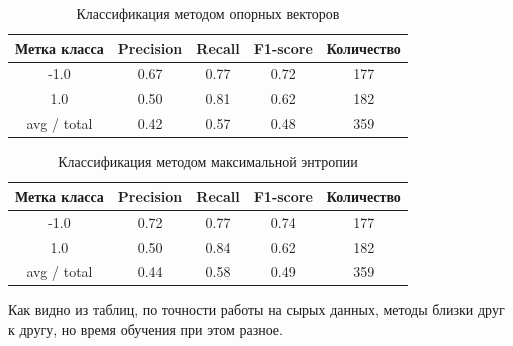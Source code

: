 \begin{table}[h]
  \begin{minipage}{\textwidth}
    \centering
    \begin{tabular}{|c|c|c|c|c|}
      \hline
      \textbf{Метка класса} & \textbf{Precision} & \textbf{Recall} & \textbf{F1-score} &
      \textbf{Количество} \\ \hline
      -1.0&0.67&0.77&0.72&177\\ \hline
      1.0&0.50&0.81&0.62&182\\ \hline \hline
      avg / total&0.42&0.57&0.48&359\\
      \hline
    \end{tabular}
    \caption{Классификация методом опорных векторов}\label{tab:svm}
  \end{minipage}
\end{table}


\begin{table}[h]
  \begin{minipage}{\textwidth}
    \centering
    \begin{tabular}{|c|c|c|c|c|}
      \hline
      \textbf{Метка класса} & \textbf{Precision} & \textbf{Recall} & \textbf{F1-score} & \textbf{Количество} \\ \hline
      -1.0&0.72&0.77&0.74&177\\ \hline
      1.0&0.50&0.84&0.62&182\\ \hline \hline
      avg / total&0.44&0.58&0.49&359\\
      \hline
    \end{tabular}
    \caption{Классификация методом максимальной энтропии}\label{tab:maxent}
  \end{minipage}
\end{table}

Как видно из таблиц, по точности работы на сырых данных, методы близки друг к другу, но время
обучения при этом разное.
